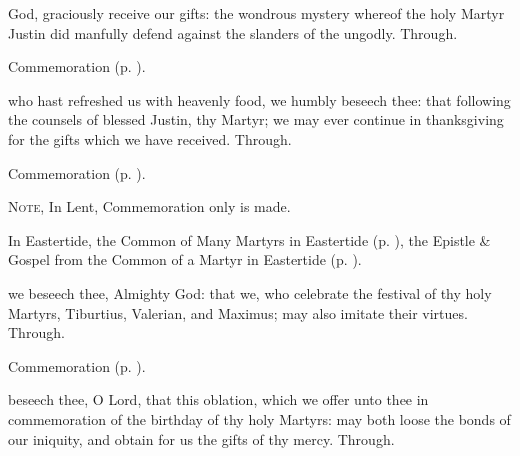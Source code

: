 \secret\label{JustinSecret}

\vspace{-0.1\baselineskip}

 God, graciously receive our gifts: the wondrous mystery whereof the holy Martyr Justin did manfully defend against the slanders of the ungodly. Through.

\begin{rubric}
	Commemoration  (p. \pageref{TiburtiusSecret}).
\end{rubric}


\postcommunion\label{JustinPostcommunion}
 who hast refreshed us with heavenly food, we humbly beseech thee: that following the counsels of blessed Justin, thy Martyr; we may ever continue in thanksgiving for the gifts which we have received. Through.

\begin{rubric}
	Commemoration  (p. \pageref{TiburtiusPostcommunion}).
\end{rubric}



\begin{rubric}
	\textsc{Note,} In Lent, Commemoration only is made.
\end{rubric}

\begin{rubric}
	In Eastertide, the Common of Many Martyrs in Eastertide (p. \pageref{CommonMartyrsEaster}), the Epistle \& Gospel from the Common of a Martyr in Eastertide (p. \pageref{CommonMartyrEaster}).
\end{rubric}

\collect\label{TiburtiusCollect}
 we beseech thee, Almighty God: that we, who celebrate the festival of thy holy Martyrs, Tiburtius, Valerian, and Maximus; may also imitate their virtues. Through.

\begin{rubric}
	Commemoration  (p. \pageref{JustinCollect}).
\end{rubric}

\secret\label{TiburtiusSecret}
 beseech thee, O Lord, that this oblation, which we offer unto thee in commemoration of the birthday of thy holy Martyrs: may both loose the bonds of our iniquity, and obtain for us the gifts of thy mercy. Through.

